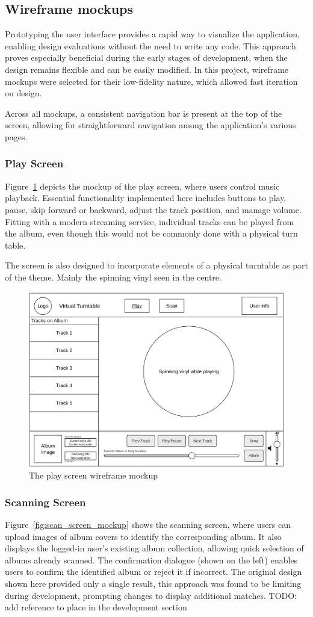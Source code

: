 \subsection{Wireframe mockups}
Prototyping the user interface provides a rapid way to visualize the application, enabling design evaluations without the need to write any code. This approach proves especially beneficial during the early stages of development, when the design remains flexible and can be easily modified. In this project, wireframe mockups were selected for their low-fidelity nature, which allowed fast iteration on design.

Across all mockups, a consistent navigation bar is present at the top of the screen, allowing for straightforward navigation among the application's various pages.

\subsubsection{Play Screen}
Figure~\ref{fig:play_screen_mockup} depicts the mockup of the play screen, where users control music playback. Essential functionality implemented here includes buttons to play, pause, skip forward or backward, adjust the track position, and manage volume. Fitting with a modern streaming service, individual tracks can be played from the album, even though this would not be commonly done with a physical turn table.

The screen is also designed to incorporate elements of a physical turntable as part of the theme. Mainly the spinning vinyl seen in the centre.
\begin{figure} [H]
    \centering
    \includegraphics[width=0.6\linewidth]{figures/play_screen_mockup.png}
    \caption{The play screen wireframe mockup}
    \label{fig:play_screen_mockup}
\end{figure}

\subsubsection{Scanning Screen}
Figure~\ref{fig:scan_screen_mockup} shows the scanning screen, where users can upload images of album covers to identify the corresponding album. It also displays the logged-in user’s existing album collection, allowing quick selection of albums already scanned. The confirmation dialogue (shown on the left) enables users to confirm the identified album or reject it if incorrect. The original design shown here provided only a single result, this approach was found to be limiting during development, prompting changes to display additional matches. TODO: add reference to place in the development section

